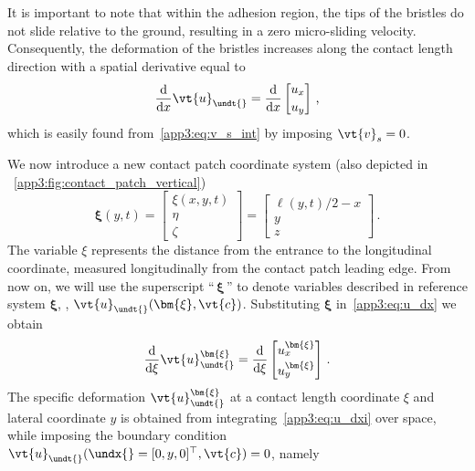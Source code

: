 It is important to note that within the adhesion region, the tips of the bristles do not slide relative to the ground, resulting in a zero micro-sliding velocity. Consequently, the deformation of the bristles increases along the contact length direction with a spatial derivative equal to
%
\begin{equation}
  \dfrac{\mathrm{d}}{\mathrm{d}x}\vt{u}_{\undt{}
} =
  \dfrac{\mathrm{d}}{\mathrm{d}x}
  \begin{bmatrix}
    u_x \\[0.2em]
    u_y
  \end{bmatrix} \, \text{,}
  \label{app3:eq:u_dx}
\end{equation}
%
which is easily found from~\eqref{app3:eq:v_s_int} by imposing $\vt{v}_s = 0$.

We now introduce a new contact patch coordinate system (also depicted in \figurename~\ref{app3:fig:contact_patch_vertical})
%
\begin{equation}
  \bm{\xi}(y,t) =
  \begin{bmatrix}
    \xi(x,y,t) \\[0.2em]
    \eta \\[0.2em]
    \zeta
  \end{bmatrix}
  =
  \begin{bmatrix}
    \ell(y,t)/2-x \\[0.2em]
    y \\[0.2em]
    z
  \end{bmatrix} \, \text{.}
\end{equation}
%
The variable $\xi$ represents the distance from the entrance to the longitudinal coordinate, measured longitudinally from the contact patch leading edge. From now on, we will use the superscript ``$\,\bm{\xi}\,$'' to denote variables described in reference system $\bm{\xi}$, \eg{}, $\vt{u}_{\undt{}
}(\bm{\xi},\vt{c})$. Substituting $\bm{\xi}$ in~\eqref{app3:eq:u_dx} we obtain
%
\begin{equation}
  \dfrac{\mathrm{d}}{\mathrm{d}\xi}\vt{u}_{\undt{}
}^{\bm{\xi}} =
  \dfrac{\mathrm{d}}{\mathrm{d}\xi}
  \begin{bmatrix}
    u_{x}^{\bm{\xi}} \\[0.2em]
    u_{y}^{\bm{\xi}}
  \end{bmatrix} \, \text{.}
  \label{app3:eq:u_dxi}
\end{equation}
%
The specific deformation $\vt{u}_{\undt{}
}^{\bm{\xi}}$ at a contact length coordinate $\xi$ and lateral coordinate $y$ is obtained from integrating~\eqref{app3:eq:u_dxi} over space, while imposing the boundary condition $\vt{u}_{\undt{}
}(\undx{} = [0,y,0]^\top,\vt{c}) = 0$, namely
